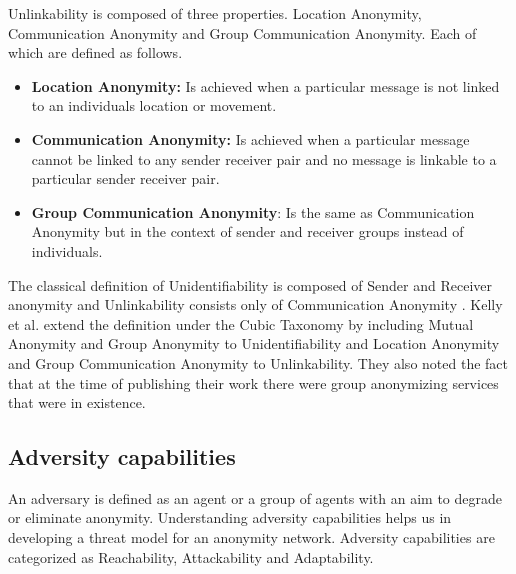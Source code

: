 \documentclass{llncs}
\begin{document}
Unlinkability is composed of three properties. Location Anonymity, Communication Anonymity and Group Communication Anonymity. Each of which are defined as follows.
\begin{itemize}
	\item[]{\textbf{Location Anonymity:} Is achieved when a particular message is not linked to an individuals location or movement.}
	\item[]{\textbf{Communication Anonymity:} Is achieved when a particular message cannot be linked to any sender receiver pair and no message is linkable to a particular sender receiver pair.}
	\item[]{\textbf{Group Communication Anonymity}: Is the same as Communication Anonymity but in the context of sender and receiver groups instead of individuals.}
\end{itemize}

The classical definition of Unidentifiability is composed of Sender and Receiver anonymity and Unlinkability consists only of Communication Anonymity \cite{terminology}. Kelly et al. \cite{kelly2012exploring} extend the definition under the Cubic Taxonomy by including Mutual Anonymity and Group Anonymity to Unidentifiability and Location Anonymity and Group Communication Anonymity to Unlinkability. They also noted the fact that at the time of publishing their work there were group anonymizing services that were in existence.

\subsection{Adversity capabilities}
An adversary is defined as an agent or a group of agents with an aim to degrade or eliminate anonymity. Understanding adversity capabilities helps us in developing a threat model for an anonymity network. Adversity capabilities are categorized as Reachability, Attackability and Adaptability.
\end{document}
